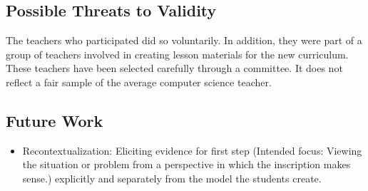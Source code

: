 \subsection{Possible Threats to Validity}
The teachers who participated did so voluntarily. In addition, they were part of a group of teachers involved in creating lesson materials for the new curriculum. These teachers have been selected carefully through a committee. It does not reflect a fair sample of the average computer science teacher.


\subsection{Future Work}

\begin{itemize}
\item Recontextualization:
Eliciting evidence for   first step (Intended focus: Viewing the situation or problem from a perspective in which the inscription makes sense.) explicitly and separately from the model the students create.

\end{itemize}


